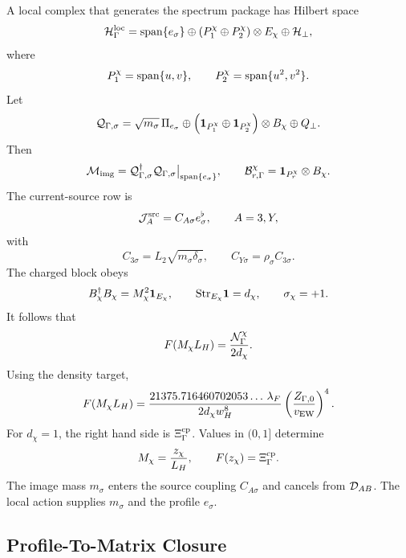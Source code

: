 \documentclass[11pt]{article}
\theoremstyle{definition}
\theoremstyle{remark}
\begin{document}
A local complex that generates the spectrum package has Hilbert space
\[
  {\cal H}_\Gamma^{\rm loc}
  =
  {\rm span}\{e_\sigma\}
  \oplus
  \left(P_1^\chi\oplus P_2^\chi\right)\otimes E_\chi
  \oplus{\cal H}_\perp ,
\]
where
\[
  P_1^\chi={\rm span}\{u,v\},
  \qquad
  P_2^\chi={\rm span}\{u^2,v^2\}.
\]
Let
\[
  {\cal Q}_{\Gamma,\sigma}
  =
  \sqrt{m_\sigma}\,\Pi_{e_\sigma}
  \oplus
  \left({\bf 1}_{P_1^\chi}\oplus{\bf 1}_{P_2^\chi}\right)
  \otimes B_\chi
  \oplus Q_\perp .
\]
Then
\[
  {\cal M}_{\rm img}
  =
  {\cal Q}_{\Gamma,\sigma}^\dagger
  {\cal Q}_{\Gamma,\sigma}\big|_{{\rm span}\{e_\sigma\}},
  \qquad
  {\cal B}_{r,\Gamma}^\chi
  =
  {\bf 1}_{P_r^\chi}\otimes B_\chi .
\]
The current-source row is
\[
  {\cal J}_A^{\rm src}
  =
  C_{A\sigma}e_\sigma^\flat,
  \qquad A=3,Y,
\]
with
\[
  C_{3\sigma}=L_2\sqrt{m_\sigma\delta_\sigma},
  \qquad
  C_{Y\sigma}=\rho_\sigma C_{3\sigma}.
\]
The charged block obeys
\[
  B_\chi^\dagger B_\chi=M_\chi^2{\bf 1}_{E_\chi},
  \qquad
  {\rm Str}_{E_\chi}{\bf 1}=d_\chi,
  \qquad
  \sigma_\chi=+1 .
\]
It follows that
\[
  F(M_\chi L_H)=\frac{{\cal N}_\Gamma^\chi}{2d_\chi}.
\]
Using the density target,
\[
  F(M_\chi L_H)
  =
  \frac{21375.716460702053\ldots\,\lambda_F}
       {2d_\chi w_H^8}
  \left(\frac{Z_{\Gamma,0}}{v_{\rm EW}}\right)^4 .
\]
For \(d_\chi=1\), the right hand side is \(\Xi_\Gamma^{\rm cp}\).  Values in
\((0,1]\) determine
\[
  M_\chi=\frac{z_\chi}{L_H},
  \qquad
  F(z_\chi)=\Xi_\Gamma^{\rm cp}.
\]
The image mass \(m_\sigma\) enters the source coupling \(C_{A\sigma}\) and
cancels from \({\cal D}_{AB}\).  The local action supplies \(m_\sigma\) and
the profile \(e_\sigma\).

\subsection{Profile-To-Matrix Closure}
\end{document}
